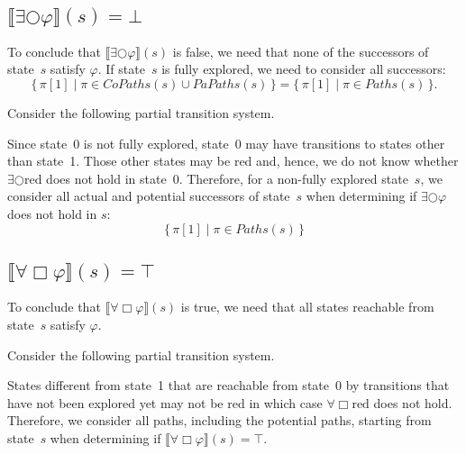 \documentclass[12pt]{article}
\newcommand{\always}{\Box}
\newcommand{\nxt}{\bigcirc}
\theoremstyle{definition}
\newcommand{\satisfaction}[1]{\llbracket #1 \rrbracket}
\newcommand{\bottom}{\mathord{\perp}}
\begin{document}
\subsection*{$\satisfaction{\exists \nxt \varphi}(s) = \bottom$}

To conclude that $\satisfaction{\exists \nxt \varphi}(s)$ is false, we need that none of the successors of state~$s$ satisfy $\varphi$.  If state~$s$ is fully explored, we need to consider all successors:
\[
\{\, \pi[1] \mid \pi \in \mathit{CoPaths}(s) \cup \mathit{PaPaths}(s) \,\}
= \{\, \pi[1] \mid \pi \in \mathit{Paths}(s) \,\}.
\]

Consider the following partial transition system.
\begin{center}
\end{center}
Since state~0 is not fully explored, state~0 may have transitions to states other than state~1.  Those other states may be red and, hence, we do not know whether  $\exists \nxt \mbox{red}$ does not hold in state~0.  Therefore, for a non-fully explored state~$s$, we consider all actual and potential successors of state~$s$ when determining if $\exists \nxt \varphi$ does not hold in $s$:
\[
\{\, \pi[1] \mid \pi \in \mathit{Paths}(s) \,\}
\]

\subsection*{$\satisfaction{\forall \always \varphi}(s) = \top$}

To conclude that $\satisfaction{\forall \always \varphi}(s)$ is true, we need that all states reachable from state~$s$ satisfy $\varphi$.

Consider the following partial transition system.
\begin{center}
\end{center}
States different from state~1 that are reachable from state~0 by transitions that have not been explored yet may not be red in which case $\forall \always \mbox{red}$ does not hold.  Therefore, we consider all paths, including the potential paths, starting from state~$s$ when determining if $\satisfaction{\forall \always \varphi}(s) = \top$.
\end{document}
